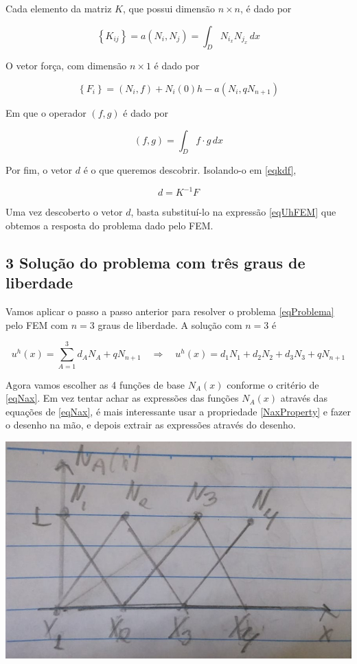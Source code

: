 \documentclass[12pt]{scrartcl}
\newcommand{\logo}{\quad \Rightarrow \quad}
\begin{document}
Cada elemento da matriz $K$, que possui dimensão $n \times  n$, é dado por

\[
    \left\{K_{ij}\right\} = a\left(N_i, N_j\right) = \int_{D} N_{i_x} N_{j_x} \, dx
\]

O vetor força, com dimensão $n \times 1$ é dado por

\[
    \left\{F_{i}\right\} = \left(N_i, f\right) + N_i(0)h - a\left(N_i, qN_{n+1}\right)
\]

Em que o operador $\left(f, g\right)$ é dado por

\[
    \left(f, g\right) = \int_{D} f \cdot g \, dx
\]

Por fim, o vetor $d$ é o que queremos descobrir. Isolando-o em \eqref{eqkdf},

\begin{equation}\label{eqdkf}
    d = K^{-1}F
\end{equation}

Uma vez descoberto o vetor $d$, basta substituí-lo na expressão \eqref{eqUhFEM} que obtemos a resposta do problema dado pelo FEM.

\subsection*{3 Solução do problema com três graus de liberdade}

Vamos aplicar o passo a passo anterior para resolver o problema \eqref{eqProblema} pelo FEM com $n = 3$ graus de liberdade.
A solução com $n = 3$ é

\[
    u^h(x) = \sum_{A=1}^3 d_AN_A + qN_{n+1}
    \logo
    u^h(x) = d_1N_1 + d_2N_2 + d_3N_3 + qN_{n+1}
\]

Agora vamos escolher as 4 funções de base $N_A(x)$ conforme o critério de \eqref{eqNax}. Em vez tentar achar as expressões das funções
$N_A(x)$ através das equações de \eqref{eqNax}, é mais interessante usar a propriedade \eqref{NaxProperty} e fazer o desenho na mão,
e depois extrair as expressões através do desenho.

\begin{center}
    \includegraphics[scale=0.5]{AA03_Nax.jpeg}
\end{center}
\end{document}

